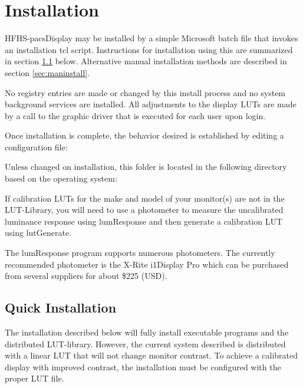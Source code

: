 %

\section{Installation}
\label{sec:install}

HFHS-pacsDisplay may be installed by a simple Microsoft batch file that invokes an installation tcl script. Instructions for installation using this are summarized in section \ref{sec:quickinstall} below. Alternative manual installation methods are described in section \ref{sec:maninstall}. 

No registry entries are made or changed by this install process and no system background services are installed. All adjustments to the display LUTs are made by a call to the graphic driver that is executed for each user upon login. 

 Once installation is complete, the behavior desired is established by editing a configuration file:


Unless changed on installation, this folder is located in the following directory based on the operating system:


If calibration LUTs for the make and model of your monitor(s) are not in the LUT-Library, you will need to use a photometer to measure the uncalibrated luminance response using lumResponse and then generate a calibration LUT using lutGenerate. 

The lumResponse program supports numerous photometers. The currently recommended photometer is the X-Rite i1Display Pro which can be purchased from several suppliers for about \$225 (USD). 

\subsection{Quick Installation}
\label{sec:quickinstall}

 The installation described below will fully install executable programs and the distributed LUT-library. However, the current system described is distributed with a linear LUT that will not change monitor contrast. To achieve a calibrated display with improved contrast, the installation must be configured with the proper LUT file.

